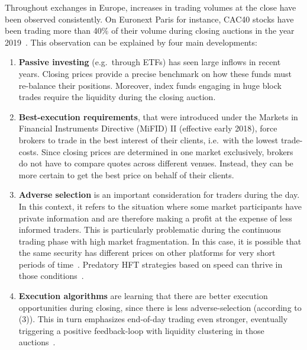 \documentclass[11pt,a4paper, notitlepage]{article}
\begin{document}
	Throughout exchanges in Europe, increases in trading volumes at the close have been observed consistently. On Euronext Paris for instance, CAC40 stocks have been trading more than 40\% of their volume during closing auctions in the year 2019~\parencite{Raillon2020}. This observation can be explained by four main developments:
	
	\begin{enumerate}[(1)]
		\item \textbf{Passive investing} (e.g.\ through ETFs) has seen large inflows in recent years. Closing prices provide a precise benchmark on how these funds must re-balance their positions. Moreover, index funds engaging in huge block trades require the liquidity during the closing auction.
		\item \textbf{Best-execution requirements}, that were introduced under the Markets in Financial Instruments Directive (MiFID) II (effective early 2018), force brokers to trade in the best interest of their clients, i.e.\ with the lowest trade-costs. Since closing prices are determined in one market exclusively, brokers do not have to compare quotes across different venues. Instead, they can be more certain to get the best price on behalf of their clients.
		\item \textbf{Adverse selection} is an important consideration for traders during the day. In this context, it refers to the situation where some market participants have private information and are therefore making a profit at the expense of less informed traders. This is particularly problematic during the continuous trading phase with high market fragmentation. In this case, it is possible that the same security has different prices on other platforms for very short periods of time~\parencite{BudishCramtonShim2015}. Predatory \ac{HFT} strategies based on speed can thrive in those conditions~\parencite{BiaisFoucaultMoinas2015}.
		\item \textbf{Execution algorithms} are learning that there are better execution opportunities during closing, since there is less adverse-selection (according to (3)). This in turn emphasizes end-of-day trading even stronger, eventually triggering a positive feedback-loop with liquidity clustering in those auctions~\parencite{Pagano1989Volume}.
	\end{enumerate}
	
\end{document}
